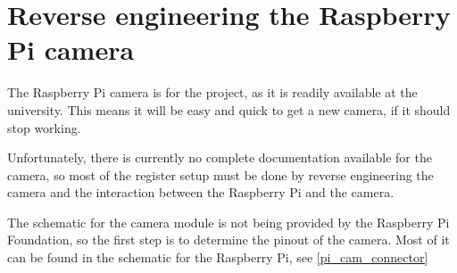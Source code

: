 \section{Reverse engineering the Raspberry Pi camera}\label{pihack}
The Raspberry Pi camera is for the project, as it is readily available at the university. This means it will be easy and quick to get a new camera, if it should stop working.

Unfortunately, there is currently no complete documentation available for the camera, so most of the register setup must be done by reverse engineering the camera and the interaction between the Raspberry Pi and the camera.

The schematic for the camera module is not being provided by the Raspberry Pi Foundation, so the first step is to determine the pinout of the camera. Most of it can be found in the schematic for the Raspberry Pi, see \autoref{pi_cam_connector}


